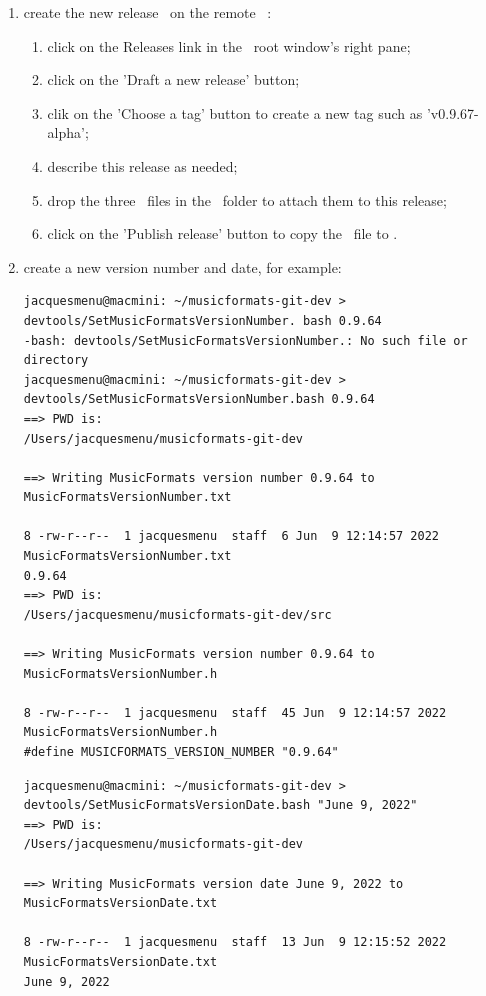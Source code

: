 \begin{enumerate}
\item create the new release \tag\ on the remote \github\ \repo:
\begin{enumerate}
\item click on the Releases link in the \repo\ root window's right pane;
\item click on the 'Draft a new release' button; 
\item clik on the 'Choose a tag' button to create a new tag such as 'v0.9.67-alpha';
\item describe this release as needed;
\item drop the three \zip\ files in the \releasesFolder\ folder to attach them to this release;
\item click on the 'Publish release' button to copy the \zip\ file to \github.
\end{enumerate}


\item create a new version number and date, for example:
\begin{lstlisting}[language=TerminalSmall]
jacquesmenu@macmini: ~/musicformats-git-dev > devtools/SetMusicFormatsVersionNumber. bash 0.9.64
-bash: devtools/SetMusicFormatsVersionNumber.: No such file or directory
jacquesmenu@macmini: ~/musicformats-git-dev > devtools/SetMusicFormatsVersionNumber.bash 0.9.64
==> PWD is:
/Users/jacquesmenu/musicformats-git-dev

==> Writing MusicFormats version number 0.9.64 to MusicFormatsVersionNumber.txt

8 -rw-r--r--  1 jacquesmenu  staff  6 Jun  9 12:14:57 2022 MusicFormatsVersionNumber.txt
0.9.64
==> PWD is:
/Users/jacquesmenu/musicformats-git-dev/src

==> Writing MusicFormats version number 0.9.64 to MusicFormatsVersionNumber.h

8 -rw-r--r--  1 jacquesmenu  staff  45 Jun  9 12:14:57 2022 MusicFormatsVersionNumber.h
#define MUSICFORMATS_VERSION_NUMBER "0.9.64"
\end{lstlisting}

\begin{lstlisting}[language=Terminal]
jacquesmenu@macmini: ~/musicformats-git-dev > devtools/SetMusicFormatsVersionDate.bash "June 9, 2022"
==> PWD is:
/Users/jacquesmenu/musicformats-git-dev

==> Writing MusicFormats version date June 9, 2022 to MusicFormatsVersionDate.txt

8 -rw-r--r--  1 jacquesmenu  staff  13 Jun  9 12:15:52 2022 MusicFormatsVersionDate.txt
June 9, 2022


\end{lstlisting}
\end{enumerate}
